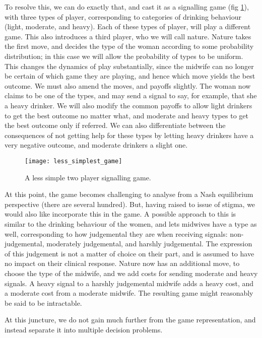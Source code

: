 To resolve this, we can do exactly that, and cast it as a signalling game (fig \ref{fig:less_simple}), with three types of player, corresponding to categories of drinking behaviour (light, moderate, and heavy). Each of these types of player, will play a different game. This also introduces a third player, who we will call nature. Nature takes the first move, and decides the type of the woman according to some probability distribution; in this case we will allow the probability of types to be uniform. 
This changes the dynamics of play substantially, since the midwife can no longer be certain of which game they are playing, and hence which move yields the best outcome. We must also amend the moves, and payoffs slightly. The woman now claims to be one of the types, and may send a signal to say, for example, that she a heavy drinker. We will also modify the common payoffs to allow light drinkers to get the best outcome no matter what, and moderate and heavy types to get the best outcome only if referred. We can also differentiate between the consequences of not getting help for these types by letting heavy drinkers have a very negative outcome, and moderate drinkers a slight one.

\begin{figure}[H]
\texttt{[image: less\_simplest\_game]}
\caption{A less simple two player signalling game. }

\label{fig:less_simple}
\end{figure}

At this point, the game becomes challenging to analyse from a Nash equilibrium perspective (there are several hundred). But, having raised to issue of stigma, we would also like incorporate this in the game. A possible approach to this is similar to the drinking behaviour of the women, and lets midwives have a type as well, corresponding to how judgemental they are when receiving signals: non-judgemental, moderately judgemental, and harshly judgemental. The expression of this judgement is not a matter of choice on their part, and is assumed to have no impact on their clinical response. Nature now has an additional move, to choose the type of the midwife, and we add costs for sending moderate and heavy signals. A heavy signal to a harshly judgemental midwife adds a heavy cost, and a moderate cost from a moderate midwife. The resulting game might reasonably be said to be intractable.

At this juncture, we do not gain much further from the game representation, and instead separate it into multiple decision problems. 

